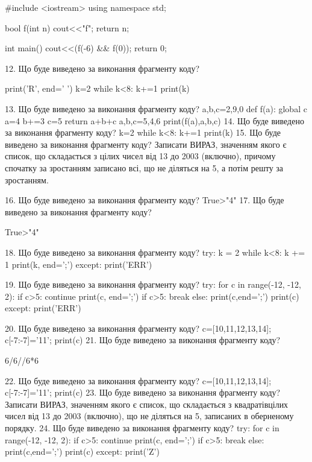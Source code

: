 \documentclass[11pt]{article}
\begin{document}
#include <iostream>
using namespace std;

bool f(int n){
    cout<<"f";
    return n;
}

int main(){
    cout<<(f(-6) && f(0));
    return 0;
}

12. Що буде виведено за виконання фрагменту коду?

print('R', end=' ')
k=2
while k<8:
    k+=1
print(k)


13. Що буде виведено за виконання фрагменту коду?
a,b,c=2,9,0
   def f(a):
     global c     a=4
     b+=3
     c=5
     return a+b+c
   a,b,c=5,4,6
   print(f(a),a,b,c)
14. Що буде виведено за виконання фрагменту коду?
k=2
   while k<8: k+=1
   print(k)
15. Що буде виведено за виконання фрагменту коду?
Записати ВИРАЗ, значенням якого є список, що складається з цілих чисел від 13 до 2003 (включно), причому спочатку за зростанням записано всі, що не діляться на 5, а потім решту за зростанням.

16. Що буде виведено за виконання фрагменту коду?
True>"4"
17. Що буде виведено за виконання фрагменту коду?

True>"4"

18. Що буде виведено за виконання фрагменту коду?
try:
    k = 2
    while k<8:
        k += 1
    print(k, end=';')
except:
    print('ERR')

19. Що буде виведено за виконання фрагменту коду?
try:
    for c in range(-12, -12, 2):
        if c>5:
            continue
        print(c, end=';')
        if c>5:
            break
    else:
        print(c,end=';')
    print(c)
except:
    print('ERR')

20. Що буде виведено за виконання фрагменту коду?
c=[10,11,12,13,14]; c[-7:-7]='11'; print(c)
21. Що буде виведено за виконання фрагменту коду?

6/6//6*6

22. Що буде виведено за виконання фрагменту коду?
c=[10,11,12,13,14]; c[-7:-7]='11'; print(c)
23. Що буде виведено за виконання фрагменту коду?
Записати ВИРАЗ, значенням якого є список, що складається з квадратівцілих чисел від 13 до 2003 (включно), що не діляться на 5, записаних в оберненому порядку.
24. Що буде виведено за виконання фрагменту коду?
try:
    for c in range(-12, -12, 2):
        if c>5:
            continue
        print(c, end=';')
        if c>5:
            break
    else:
        print(c,end=';')
    print(c)
except:
    print('Z')
\end{document}
